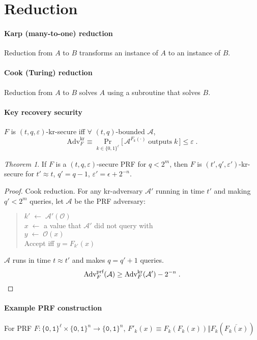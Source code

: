 \documentclass[11pt]{article}
\newcommand{\eqdef}{\ensuremath{\equiv}}
\newcommand{\eps}{\ensuremath{\varepsilon}}
\newcommand{\bit}{\ensuremath{\{\texttt{0},\texttt{1}\}}}
\theoremstyle{remark}
\newtheorem{thm}{Theorem}
\begin{document}
\section{Reduction}

\paragraph{Karp (many-to-one) reduction}
Reduction from $A$ to $B$ transforms
an instance of $A$ to an instance of $B$.

\paragraph{Cook (Turing) reduction}
Reduction from $A$ to $B$ solves $A$
using a subroutine that solves $B$.

\paragraph{Key recovery security}
$F$ is $(t,q,\eps)$-kr-secure
iff $\forall$ $(t,q)$-bounded $\mathcal{A}$,
\[ \textrm{Adv}_F^\textrm{kr} \eqdef
\Pr_{k \in \{0,1\}^\ell} \big[\,
  \mathcal{A}^{F_k(\cdot)}\;\textrm{outputs}\;k
\,\big] \le \eps \;\textrm{.} \]

\begin{thm}
If $F$ is a $(t,q,\eps)$-secure PRF
for $q < 2^m$, then
$F$ is $(t',q',\eps')$-kr-secure for
$t' \approx t$, $q' = q-1$, $\eps' = \epsilon + 2^{-n}$.
\begin{proof}
Cook reduction.
For any kr-adversary $\mathcal{A'}$ running in
time $t'$ and making $q'<2^m$ queries, let $\mathcal{A}$ be
the PRF adversary:
\begin{quote}
$k' \; \leftarrow \; \mathcal{A}'(\mathcal{O})$ \\
$x \; \leftarrow$ a value that $\mathcal{A}'$ did not query with \\
$y \; \leftarrow \; \mathcal{O}(x)$ \\
Accept iff $y = F_{k'}(x)$
\end{quote}
$\mathcal{A}$ runs in time $t \approx t'$ and makes $q = q'+1$ queries.
\[ \textrm{Adv}_F^\textrm{prf}(\mathcal{A}) \ge
\textrm{Adv}_F^\textrm{kr}(\mathcal{A}') - 2^{-n}
\;\textrm{.} \qedhere \]
\end{proof}
\end{thm}

\paragraph{Example PRF construction}
For PRF $F : \bit^\ell \times \bit^n \rightarrow \bit^n$,
$F'_k(x) \eqdef F_k(F_k(x)) \Vert F_k(\overline{F_k(x)})$
\end{document}
